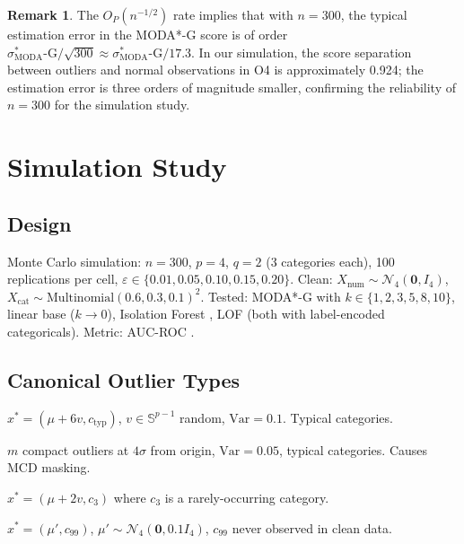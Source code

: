 \documentclass[11pt]{article}
\theoremstyle{plain}
\theoremstyle{definition}
\newtheorem{remark}{Remark}
\newcommand{\moda}{\text{MODA}^*\text{-G}}
\begin{document}
\begin{remark}
The $O_P(n^{-1/2})$ rate implies that with $n = 300$,
the typical estimation error in the MODA*-G score is
of order $\sigma_\moda/\sqrt{300} \approx \sigma_\moda/
17.3$. In our simulation, the score separation between
outliers and normal observations in O4 is approximately
0.924; the estimation error is three orders of magnitude
smaller, confirming the reliability of $n = 300$ for
the simulation study.
\end{remark}

\section{Simulation Study}
\label{sec:simulation}

\subsection{Design}

Monte Carlo simulation: $n = 300$, $p = 4$, $q = 2$
(3 categories each), 100 replications per cell,
$\varepsilon \in \{0.01, 0.05, 0.10, 0.15, 0.20\}$.
Clean: $X_\text{num} \sim \mathcal{N}_4(\mathbf{0},
I_4)$, $X_\text{cat} \sim \text{Multinomial}
(0.6, 0.3, 0.1)^2$.
Tested: MODA*-G with $k \in \{1,2,3,5,8,10\}$,
linear base ($k \to 0$), Isolation Forest
\citep{liu2008}, LOF \citep{breunig2000} (both with
label-encoded categoricals). Metric: AUC-ROC
\citep{fawcett2006}.

\subsection{Canonical Outlier Types}

\begin{description}[leftmargin=*]
\item[$O_1$: Isolated numerical] $x^* = (\mu + 6v,
  c_\text{typ})$, $v \in \mathbb{S}^{p-1}$ random,
  $\text{Var} = 0.1$. Typical categories.
\item[$O_2$: Clustered numerical] $m$ compact outliers
  at $4\sigma$ from origin, $\text{Var} = 0.05$,
  typical categories. Causes MCD masking.
\item[$O_3$: Moderate mixed] $x^* = (\mu + 2v, c_3)$
  where $c_3$ is a rarely-occurring category.
\item[$O_4$: Pure categorical] $x^* = (\mu', c_{99})$,
  $\mu' \sim \mathcal{N}_4(\mathbf{0}, 0.1I_4)$,
  $c_{99}$ never observed in clean data.
\end{description}
\end{document}
